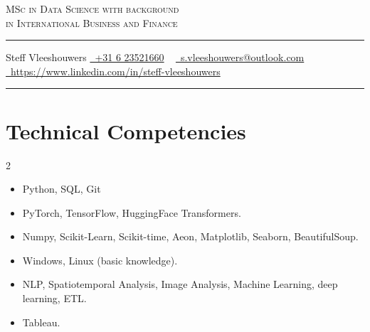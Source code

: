 \documentclass[letterpaper,10pt]{article}
\newcommand{\documentTitle}[2]{
  \begin{center}
    {\Huge\scshape\color{accentTitle} #1\par} %
    \vspace{10pt}
    {\color{accentLine} \hrule}
    \vspace{2pt}
    \footnotesize{#2}
    \vspace{2pt}
    {\color{accentLine} \hrule}
  \end{center}
}
\begin{document}

  \documentTitle{MSc in Data Science with background\\ in International Business and Finance}{
    \faIdBadge\space Steff Vleeshouwers
    \href{tel:+31623521660}{
      \raisebox{-0.05\height} \faPhone\ +31 6 23521660} ~
    \href{mailto:s.vleeshouwers@outlook.com}{
      \raisebox{-0.15\height} \faEnvelope\ s.vleeshouwers@outlook.com} ~
    \href{https://www.linkedin.com/in/steff-vleeshouwers}{
      \raisebox{-0.15\height} \faLinkedin\ https://www.linkedin.com/in/steff-vleeshouwers} ~
  }


  \section{Technical Competencies}
  \begin{multicols}{2}
    \begin{itemize}[left=0pt, labelwidth=2em, labelsep=0.5em, align=left, itemsep=1pt, parsep=1pt]%
      \item[\textbf{Languages:}] Python, SQL, Git 
      \item[\textbf{Deep Learning:}] PyTorch, TensorFlow, \newline HuggingFace Transformers.
      \item[\textbf{Other tools:}] Numpy, Scikit-Learn, Scikit-time, Aeon, Matplotlib, Seaborn, BeautifulSoup.
      \columnbreak
      \item[\textbf{OS:}] Windows, Linux (basic knowledge).
      \item[\textbf{Theoretical knowledge:}] NLP, Spatiotemporal Analysis, Image Analysis, Machine Learning, deep learning, ETL.
      \item[\textbf{Dashboarding:}] Tableau.
    \end{itemize}
  \end{multicols}



\end{document}
